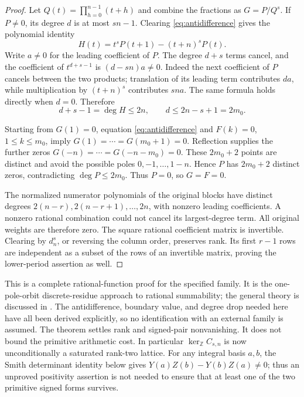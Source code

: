\documentclass[11pt]{article}
\theoremstyle{remark}
\newcommand{\Z}{\mathbb Z}
\begin{document}
\begin{proof}
Let \(Q(t)=\prod_{h=0}^{n-1}(t+h)\) and combine the fractions as
\(G=P/Q^s\). If \(P\ne0\), its degree \(d\) is at most \(sn-1\).
Clearing \eqref{eq:antidifference} gives the polynomial identity
\begin{equation}
 H(t)=t^sP(t+1)-(t+n)^sP(t).
 \label{eq:rank-degree}
\end{equation}
Write \(a\ne0\) for the leading coefficient of \(P\). The degree
\(d+s\) terms cancel, and the coefficient of \(t^{d+s-1}\) is
\((d-sn)a\ne0\). Indeed the next coefficient of \(P\) cancels
between the two products; translation of its leading term contributes
\(da\), while multiplication by \((t+n)^s\) contributes \(sna\).
The same formula holds directly when \(d=0\). Therefore
\[
 d+s-1=\deg H\le2n,\qquad d\le2n-s+1=2m_0.
\]

Starting from \(G(1)=0\), equation \eqref{eq:antidifference} and
\(F(k)=0\), \(1\le k\le m_0\), imply
\(G(1)=\cdots=G(m_0+1)=0\).
Reflection supplies the further zeros
\(G(-n)=\cdots=G(-n-m_0)=0\).
These \(2m_0+2\) points are distinct and avoid the possible poles
\(0,-1,\ldots,1-n\). Hence \(P\) has \(2m_0+2\) distinct zeros,
contradicting \(\deg P\le2m_0\). Thus \(P=0\), so \(G=F=0\).

The normalized numerator polynomials of the original blocks have
distinct degrees \(2(n-r),2(n-r+1),\ldots,2n\), with nonzero leading
coefficients. A nonzero rational combination could not cancel its
largest-degree term. All original weights are therefore zero.
The square rational coefficient matrix is invertible. Clearing by
\(d_n^s\), or reversing the column order, preserves rank. Its first
\(r-1\) rows are independent as a subset of the rows of an invertible
matrix, proving the lower-period assertion as well.
\end{proof}

This is a complete rational-function proof for the specified family.
It is the one-pole-orbit discrete-residue approach to rational
summability; the general theory is discussed in
\cite{discrete-residues,discrete-residues-new}. The antidifference,
boundary value, and degree drop needed here have all been derived
explicitly, so no identification with an external family is assumed.
The theorem settles rank and signed-pair nonvanishing. It does not
bound the primitive arithmetic cost.
In particular \(\ker_{\Z}C_{s,n}\) is now unconditionally a saturated
rank-two lattice. For any integral basis \(a,b\), the Smith determinant
identity below gives \(Y(a)Z(b)-Y(b)Z(a)\ne0\); thus an unproved
positivity assertion is not needed to ensure that at least one of the
two primitive signed forms survives.
\end{document}
